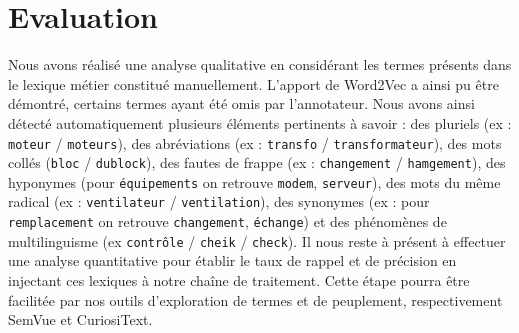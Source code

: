\section{Evaluation}
Nous avons réalisé une analyse qualitative en considérant les termes présents dans le lexique métier constitué manuellement. L'apport de Word2Vec a ainsi pu être démontré, certains termes ayant été omis par l'annotateur. Nous avons ainsi détecté automatiquement plusieurs éléments pertinents à savoir : des pluriels (ex : \texttt{moteur} / \texttt{moteurs}), des abréviations (ex : \texttt{transfo} / \texttt{transformateur}), des mots collés (\texttt{bloc} / \texttt{dublock}), des fautes de frappe (ex : \texttt{changement} / \texttt{hamgement}), des hyponymes (pour \texttt{équipements} on retrouve \texttt{modem}, \texttt{serveur}), des mots du même radical (ex : \texttt{ventilateur} / \texttt{ventilation}), des synonymes (ex : pour \texttt{remplacement} on retrouve \texttt{changement}, \texttt{échange}) et des phénomènes de multilinguisme (ex \texttt{contrôle} / \texttt{cheik} / \texttt{check}). 
Il nous reste à présent à effectuer une analyse quantitative pour établir le taux de rappel et de précision en injectant ces lexiques à notre chaîne de traitement. Cette étape pourra être facilitée par nos outils d’exploration de termes et de peuplement, respectivement SemVue et CuriosiText.
